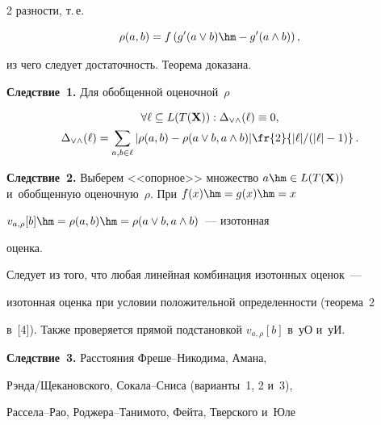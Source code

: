 \begin{multicols}{2}
разности, т.\,е.\

$$

\rho(a,b) = f\left(g^\prime(a\vee b) \hm- g^\prime (a\wedge b)\right),

$$ 

из чего следует достаточность. Теорема доказана.



\smallskip



\noindent

\textbf{Следствие~1.} Для обобщенной оценочной~$\rho$ 

\begin{multline*}

\forall \ell \subseteq L(T(\mathbf{X})): \Delta_{\vee\wedge}(\ell)\equiv 0,\\ 

\Delta_{\vee\wedge}(\ell)=  \sum\limits_{a,b\in \ell} \vert\rho(a,b)- 

\rho(a\vee b, a\wedge b)\vert \fr{2}{\vert\ell\vert/(\vert\ell\vert -1)}\,.

\end{multline*}



\smallskip



\noindent

\textbf{Следствие~2.} Выберем <<опорное>> множество $a\hm\in 

L(T(\mathbf{X}))$ и~обобщенную оценочную~$\rho$. При $f(x)\hm= g(x)\hm= x$ 

$v_{a,\rho}[b]\hm= \rho(a,b)\hm= \rho(a\vee b, a\wedge b)$~--- изотонная 

оценка. 



Следует из того, что любая линейная комбинация изотонных оценок~--- 

изотонная оценка при условии положительной определенности (теорема~2 

в~[4]). Также проверяется прямой подстановкой $v_{a,\rho}[b]$ в~уО и~уИ. 



\smallskip



\noindent

\textbf{Следствие~3.} Расстояния Фре\-ше--Ни\-ко\-ди\-ма, Амана,  

Рэн\-да/Ще\-ка\-нов\-ско\-го, Со\-ка\-ла--Сни\-са (варианты~1, 2 и~3),  

Рас\-се\-ла--Рао, Род\-же\-ра--Та\-ни\-мо\-то, Фейта, Тверского и~Юле 


\end{multicols}
